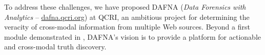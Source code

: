 \documentclass[prodmode,acmtecs]{acmsmall} %
\begin{document}
To address these challenges, we have proposed DAFNA (\emph{Data Forensics with Analytics} -- \url{dafna.qcri.org}) 
at QCRI, an ambitious project for determining the veracity of  cross-modal information from multiple Web sources. Beyond 
a first module demonstrated in \cite{Wagui15}, DAFNA's vision is to provide a platform for actionable and cross-modal truth
discovery.
 
 
 




\end{document}
